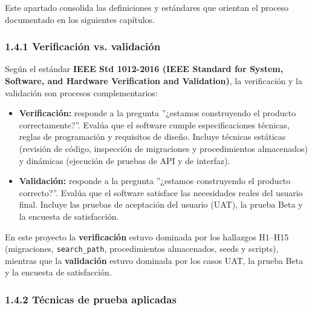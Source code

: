 \documentclass[11pt,a4paper]{article}
\begin{document}
Este apartado consolida las definiciones y estándares que orientan el proceso documentado en los siguientes capítulos.


\subsubsection*{1.4.1 Verificación vs. validación}


Según el estándar \textbf{IEEE Std 1012-2016 (IEEE Standard for System, Software, and Hardware Verification and Validation)}, la verificación y la validación son procesos complementarios:


\begin{itemize}[leftmargin=*]
\item \textbf{Verificación:} responde a la pregunta ''¿estamos construyendo el producto correctamente?''. Evalúa que el software cumple especificaciones técnicas, reglas de programación y requisitos de diseño. Incluye técnicas estáticas (revisión de código, inspección de migraciones y procedimientos almacenados) y dinámicas (ejecución de pruebas de API y de interfaz).
\item \textbf{Validación:} responde a la pregunta ''¿estamos construyendo el producto correcto?''. Evalúa que el software satisface las necesidades reales del usuario final. Incluye las pruebas de aceptación del usuario (UAT), la prueba Beta y la encuesta de satisfacción.
\end{itemize}


En este proyecto la \textbf{verificación} estuvo dominada por los hallazgos H1--H15 (migraciones, \texttt{search\_path}, procedimientos almacenados, seeds y scripts), mientras que la \textbf{validación} estuvo dominada por los casos UAT, la prueba Beta y la encuesta de satisfacción.


\subsubsection*{1.4.2 Técnicas de prueba aplicadas}
\end{document}

